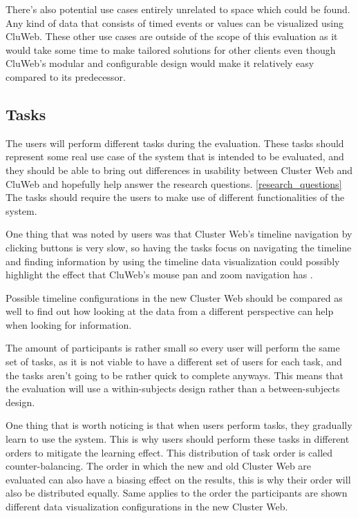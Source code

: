There's also potential use cases entirely unrelated to space which could be found. Any kind of data that consists of timed events or values can be visualized using CluWeb. These other use cases are outside of the scope of this evaluation as it would take some time to make tailored solutions for other clients even though CluWeb's modular and configurable design would make it relatively easy compared to its predecessor.

\cite{rubin2008handbook, albert2013measuring}

\subsection{Tasks}
The users will perform different tasks during the evaluation. These tasks should represent some real use case of the system that is intended to be evaluated, and they should be able to bring out differences in usability between Cluster Web and CluWeb and hopefully help answer the research questions. \ref{research_questions} The tasks should require the users to make use of different functionalities of the system.

One thing that was noted by users was that Cluster Web's timeline navigation by clicking buttons is very slow, so having the tasks focus on navigating the timeline and finding information by using the timeline data visualization could possibly highlight the effect that CluWeb's mouse pan and zoom navigation has .

Possible timeline configurations in the new Cluster Web should be compared as well to find out how looking at the data from a different perspective can help when looking for information.

The amount of participants is rather small so every user will perform the same set of tasks, as it is not viable to have a different set of users for each task, and the tasks aren't going to be rather quick to complete anyways. This means that the evaluation will use a within-subjects design rather than a between-subjects design. 

One thing that is worth noticing is that when users perform tasks, they gradually learn to use the system. This is why users should perform these tasks in different orders to mitigate the learning effect. This distribution of task order is called counter-balancing. The order in which the new and old Cluster Web are evaluated can also have a biasing effect on the results, this is why their order will also be distributed equally. Same applies to the order the participants are shown different data visualization configurations in the new Cluster Web.
\cite{rubin2008handbook}

